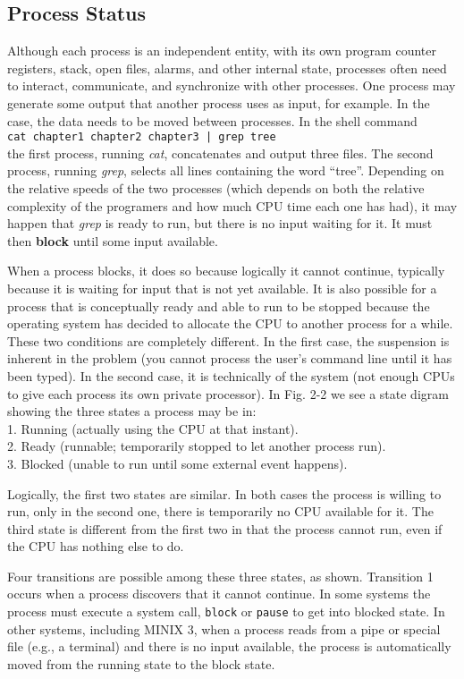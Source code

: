 \documentclass{book}
\newcommand {\kw}  [1] {\textbf{#1}}
\newcommand {\sys} [1] {\textsl{#1}}
\newcommand {\cmd} [1] {\texttt{#1}}
\begin{document}
\subsection{Process Status}
Although each process is an independent entity, 
with its own program counter registers, stack, open files, alarms, and other internal state,
processes often need to interact, communicate, and synchronize with other processes.
One process may generate some output that another process uses as input, for example.
In the case, the data needs to be moved between processes.
In the shell command\\
\cmd{cat chapter1 chapter2 chapter3 | grep tree}\\
the first process, running \sys{cat}, concatenates and output three files.
The second process, running \sys{grep}, selects all lines containing the word ``tree''.
Depending on the relative speeds of the two processes (which depends on both 
the relative complexity of the programers and how much CPU time each one has had),
it may happen that \sys{grep} is ready to run, but there is no input waiting for it.
It must then \kw{block} until some input available.

When a process blocks, it does so because logically it cannot continue, 
typically because it is waiting for input that is not yet available.
It is also possible for a process that is conceptually ready and able to run to be stopped 
because the operating system has decided to allocate the CPU to another process for a while.
These two conditions are completely different.
In the first case, the suspension is inherent in the problem 
(you cannot process the user's command line until it has been typed).
In the second case, it is technically of the system (not enough CPUs to give each process its own private processor).
In Fig. 2-2 we see a state digram showing the three states a process may be in:\\
1. Running (actually using the CPU at that instant).\\
2. Ready (runnable; temporarily stopped to let another process run).\\
3. Blocked (unable to run until some external event happens).

Logically, the first two states are similar.
In both cases the process is willing to run, only in the second one, there is temporarily no CPU available for it.
The third state is different from the first two in that the process cannot run, even if the CPU has nothing else to do.

Four transitions are possible among these three states, as shown.
Transition 1 occurs when a process discovers that it cannot continue.
In some systems the process must execute a system call, \cmd{block} or \cmd{pause} to get into blocked state.
In other systems, including MINIX 3, when a process reads from a pipe or special file (e.g., a terminal) and there is no input available,
the process is automatically moved from the running state to the block state.
\end{document}
